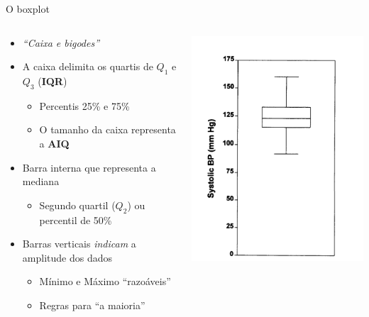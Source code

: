 \documentclass{beamer}
\begin{document}
\begin{frame}{\scriptsize O boxplot}
  \begin{columns}
    \begin{column}{7cm}
      \begin{itemize}
        \scriptsize
      \item {\em ``Caixa e bigodes''}
        \medskip
      \item A caixa delimita os quartis de $Q_1$ e $Q_3$ ({\bf IQR})
        \begin{itemize}
          \scriptsize
        \item Percentis 25\% e 75\%
        \item O tamanho da caixa representa a {\bf AIQ}
        \end{itemize}
      \item Barra interna que representa a mediana
        \begin{itemize}
          \scriptsize
        \item Segundo quartil ($Q_2$) ou percentil de 50\%
        \end{itemize}
        \medskip
      \item Barras verticais {\em indicam} a amplitude dos dados
        \begin{itemize}
          \scriptsize
        \item Mínimo e Máximo ``razoáveis''
        \item Regras para ``a maioria''
        \end{itemize}
      \end{itemize}
    \end{column}
    \begin{column}{5cm}
      \includegraphics[height=\textheight]{Cap3/boxplot}
    \end{column}
  \end{columns}
\end{frame}
\end{document}

